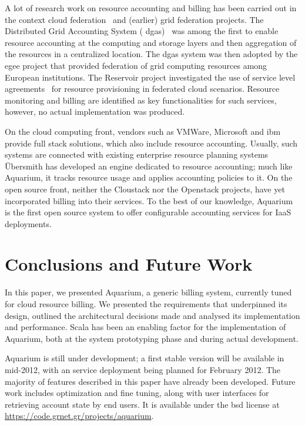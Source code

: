 \documentclass[preprint,10pt]{sigplanconf}
\begin{document}
A lot of research work on resource accounting and billing has been carried out
in the context cloud federation~\cite{Rochw09, Elmro09} and (earlier) grid
federation projects. The Distributed Grid Accounting System ({\sc
dgas})~\cite{Piro06} was among the first to enable resource accounting at the
computing and storage layers and then aggregation of the resources in a
centralized location. The {\sc dgas} system was then adopted by the {\sc egee}
project that provided federation of grid computing resources among European
institutions. The Reservoir project investigated the use of service level
agreements~\cite{Elmro09} for resource provisioning in federated cloud
scenarios. Resource monitoring and billing are identified as key
functionalities for such services, however, no actual implementation was
produced.

On the cloud computing front, vendors such as VMWare, Microsoft and {\sc ibm}
provide full stack solutions, which also include resource accounting. Usually,
such systems are connected with existing enterprise resource planning systems
\"Ubersmith has developed an engine dedicated to resource accounting; much like
Aquarium, it tracks resource usage and applies accounting policies to it.
On the open source front, neither the Cloustack nor the Openstack projects,
have yet incorporated billing into their services. To the best of our
knowledge, Aquarium is the first open source system to offer configurable
accounting services for IaaS deployments.

\section{Conclusions and Future Work}

In this paper, we presented Aquarium, a generic billing system, currently tuned
for cloud resource billing. We presented the requirements that underpinned its
design, outlined the architectural decisions made and analysed its
implementation and performance.
Scala has been an enabling factor for the
implementation of Aquarium, both at the system prototyping phase and during
actual development.  

Aquarium is still under development; a first stable version will be available
in mid-2012, with an service deployment being planned for February 2012. 
The majority of features described in this paper have already been developed.
Future work includes optimization and fine tuning, along with user interfaces
for retrieving account state by end users.
It is available under the {\sc bsd} license at 
\url{https://code.grnet.gr/projects/aquarium}.



\end{document}
